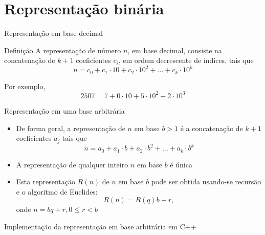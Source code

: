 \section*{Representação binária}

\begin{frame}[fragile]{Representação em base decimal}

    \begin{block}{Definição}
        A representação de número $n$, em base decimal, consiste na concatenação de $k + 1$ coeficientes $c_i$, em ordem decrescente de índices, tais que
        $$
        n = c_0 + c_1\cdot 10 + c_2\cdot 10^2 + \ldots + c_k\cdot 10^k
        $$
    \end{block}

    \vspace{0.2in}

    Por exemplo,
$$
            2507 = 7 + 0\cdot 10 + 5\cdot 10^2 + 2\cdot 10^3
$$

\end{frame}

\begin{frame}[fragile]{Representação em uma base arbitrária}

    \begin{itemize}
        \item De forma geral, a representação de $n$ em base $b > 1$ é a concatenação de $k + 1$ coeficientes $a_j$ tais que
$$
n = a_0 + a_1\cdot b + a_2\cdot b^2 + \ldots + a_k\cdot b^k
$$

        \item A representação de qualquer inteiro $n$ em base $b$ é única

        \item Esta representação $R(n)$ de $n$ em base $b$ pode ser obtida usando-se recursão e o algoritmo de Euclides: 
$$R(n) = R(q)b + r,$$
        onde $n = bq + r, 0 \leq r < b$
    \end{itemize}

\end{frame}

\begin{frame}[fragile]{Implementação da representação em base arbitrária em C++}
\end{frame}

